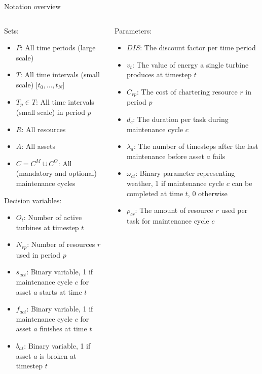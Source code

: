\documentclass{beamer}
\begin{document}
\begin{frame}{Notation overview}
\tiny

\begin{columns}
\begin{column}{.48\textwidth}
Sets:
\begin{itemize}
\item $P$: All time periods (large scale)
\item $T$: All time intervals (small scale) [$t_0, \dots , t_N$]
\item $T_p \in T$: All time intervals (small scale) in period $p$
\item $R$: All resources
\item $A$: All assets
\item $C = C^M \cup C^O$: All (mandatory and optional) maintenance cycles
\end{itemize}

Decision variables:
\begin{itemize}
\item $O_{t}$: Number of active turbines at timestep $t$
\item $N_{rp}$: Number of resources $r$ used in period $p$
\item $s_{act}$: Binary variable, 1 if maintenance cycle $c$ for asset $a$ starts at time $t$
\item $f_{act}$: Binary variable, 1 if maintenance cycle $c$ for asset $a$ finishes at time $t$
\item $b_{at}$: Binary variable, 1 if asset $a$ is broken at timestep $t$
\end{itemize}
\end{column}

\hfill

\begin{column}{.48\textwidth}
Parameters:
\begin{itemize}
\item $DIS$: The discount factor per time period
\item $v_t$: The value of energy a single turbine produces at timestep $t$
\item $C_{rp}$: The cost of chartering resource $r$ in period $p$
\item $d_c$: The duration per task during maintenance cycle $c$
\item $\lambda_a$: The number of timesteps after the last maintenance before asset $a$ fails
\item $\omega_{ct}$: Binary parameter representing weather, 1 if maintenance cycle $c$ can be completed at time $t$, 0 otherwise
\item $\rho_{cr}$: The amount of resource $r$ used per task for maintenance cycle $c$
\end{itemize}
\end{column}
\end{columns}

\end{frame}
\end{document}
